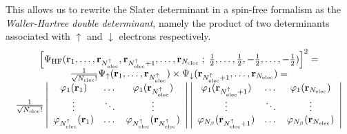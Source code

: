 \documentclass[./thesis.tex]{subfiles}
\begin{document}
This allows us to rewrite the Slater determinant in a spin-free formalism as
the \emph{Waller-Hartree double determinant},\cite{Pauncz_1989} namely the
product of two determinants associated with $\uparrow$ and $\downarrow$ electrons
respectively.
\begin{equation}
\begin{array}{c}
\left[ \Psi_\textrm{HF}({\bf r}_1,\dots,{\bf r}_{{N_\text{elec}^{\uparrow}}},{\bf r}_{{N_\text{elec}^{\uparrow}}+1},\dots,{\bf r}_{N_\text{elec}} \; ; \;
      \tfrac{1}{2},\dots,\tfrac{1}{2},-\tfrac{1}{2},\dots,-\tfrac{1}{2}) \right]^2 = \\
\frac{1}{\sqrt{{N_\text{elec}}!}} \Psi_\uparrow({\bf r}_1,\dots,{\bf r}_{{N_\text{elec}^{\uparrow}}}) \times \Psi_\downarrow({\bf r}_{{N_\text{elec}^{\uparrow}}+1},\dots,{\bf r}_{N_\text{elec}}) = \\
\frac{1}{\sqrt{{N_\text{elec}}!}} \left|
 \begin{array}{ccc}
 \varphi_1({\bf r}_1) & \dots & \varphi_1({\bf r}_{{N_\text{elec}^{\uparrow}}}) \\
 \vdots               & \ddots &   \vdots             \\
 \varphi_{{N_\text{elec}^{\uparrow}}}({\bf r}_1) & \dots & \varphi_{{N_\text{elec}^{\uparrow}}}({\bf r}_{{N_\text{elec}^{\uparrow}}}) \\
 \end{array}
\right|
\left|
 \begin{array}{ccc}
 \varphi_1({\bf r}_{{N_\text{elec}^{\uparrow}}+1}) & \dots & \varphi_1({\bf r}_{{N_\text{elec}}}) \\
 \vdots               & \ddots &   \vdots             \\
 \varphi_{N_\beta}({\bf r}_{{N_\text{elec}^{\uparrow}}+1}) & \dots & \varphi_{N_\beta}({\bf r}_{{N_\text{elec}}}) \\
 \end{array}
\right| \\ 
\end{array} \\
\label{eq:slater}
\end{equation}
\end{document}
